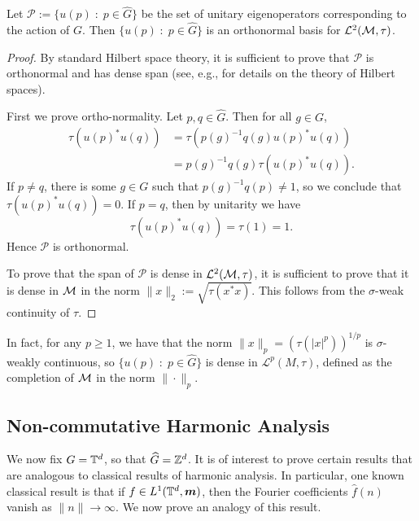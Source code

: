 \begin{proposition}
    Let $\mathcal{P} := \{u(p)\;:\;p \in \widehat{G}\}$ be the set of unitary eigenoperators
    corresponding to the action of $G$. Then $\{u(p)\;:\; p \in \widehat{G}\}$
    is an orthonormal basis for $\mathcal{L}^2(\mathcal{M},\tau)$.
\end{proposition}
\begin{proof}
    By standard Hilbert space theory, it is sufficient to prove that $\mathcal{P}$
    is orthonormal and has dense span (see, e.g., \cite{rudin} for details on
    the theory of Hilbert spaces).
    
    First we prove ortho-normality. Let $p,q \in \widehat{G}$. Then for all $g \in G$,
    \begin{align}
        \tau(u(p)^*u(q)) &= \tau(p(g)^{-1}q(g)u(p)^*u(q))\\
        &= p(g)^{-1}q(g)\tau(u(p)^*u(q)).
    \end{align}
    If $p \neq q$, there is some $g \in G$ such that $p(g)^{-1}q(p) \neq 1$,
    so we conclude that $\tau(u(p)^*u(q)) = 0$.
    If $p = q$, then by unitarity we have
    \begin{equation}
        \tau(u(p)^*u(q)) = \tau(1) = 1.
    \end{equation}
    Hence $\mathcal{P}$ is orthonormal.
    
    To prove that the span of $\mathcal{P}$ is dense in $\mathcal{L}^2(\mathcal{M},\tau)$,
    it is sufficient to prove that it is dense in $\mathcal{M}$ in the norm $\|x\|_2 := \sqrt{\tau(x^*x)}$.
    This follows from the $\sigma$-weak continuity of $\tau$.
\end{proof}

\begin{remark}
    In fact, for any $p \geq 1$, we have that the norm $\|x\|_p = (\tau(|x|^p))^{1/p}$
    is $\sigma$-weakly continuous, so $\{u(p)\;:\;p \in \widehat{G}\}$
    is dense in $\mathcal{L}^p(M,\tau)$, defined as the completion of $\mathcal{M}$
    in the norm $\|\cdot\|_p$. 
\end{remark}


\subsection{Non-commutative Harmonic Analysis}

We now fix $G = \mathbb{T}^d$, so that $\widehat{G} = \mathbb{Z}^d$. It is of interest
to prove certain results that are analogous to classical results of harmonic
analysis. In particular, one known classical result is that if $f \in L^1(\mathbb{T}^d,\boldsymbol{m})$,
then the Fourier coefficients $\hat{f}(n)$ vanish as $\|n\|\rightarrow \infty$. We now
prove an analogy of this result. 

